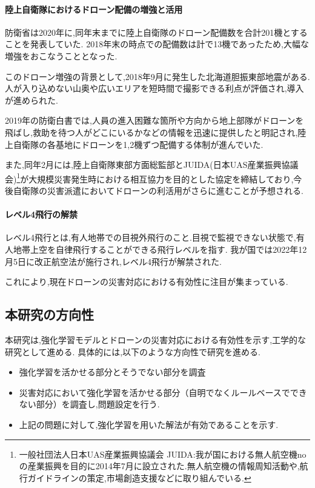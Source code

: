 \documentclass{article}[jsarticle]
\begin{document}
\paragraph{陸上自衛隊におけるドローン配備の増強と活用}
防衛省は2020年に,同年末までに陸上自衛隊のドローン配備数を合計201機とすることを発表\cite{news02}していた.
2018年末の時点での配備数は計で13機であったため,大幅な増強をおこなうこととなった.\par
このドローン増強の背景として,2018年9月に発生した北海道胆振東部地震がある.人が入り込めない山奥や広いエリアを短時間で撮影できる利点が評価され,導入が進められた.\par
2019年の防衛白書では,人員の進入困難な箇所や方向から地上部隊がドローンを飛ばし,救助を待つ人がどこにいるかなどの情報を迅速に提供したと明記され,陸上自衛隊の各基地にドローンを1,2機ずつ配備する体制が進んでいた.\par
また,同年2月には,陸上自衛隊東部方面総監部とJUIDA(日本UAS産業振興協議会)\footnote{一般社団法人日本UAS産業振興協議会 JUIDA:我が国における無人航空機no
の産業振興を目的に2014年7月に設立された.無人航空機の情報周知活動や,航行ガイドラインの策定,市場創造支援などに取り組んでいる.}が大規模災害発生時における相互協力を目的とした協定を締結しており,今後自衛隊の災害派遣においてドローンの利活用がさらに進むことが予想される.
\paragraph{レベル4飛行の解禁} \par
レベル4飛行とは,有人地帯での目視外飛行のこと.目視で監視できない状態で,有人地帯上空を自律飛行することができる飛行レベルを指す.
我が国では2022年12月5日に改正航空法が施行され,レベル4飛行が解禁された\cite{doc01}.\par 
これにより,現在ドローンの災害対応における有効性に注目が集まっている.

\subsection{本研究の方向性}
本研究は,強化学習モデルとドローンの災害対応における有効性を示す,工学的な研究として進める.
具体的には,以下のような方向性で研究を進める.
\begin{itemize}
    \item 強化学習を活かせる部分とそうでない部分を調査
    \item 災害対応において強化学習を活かせる部分（自明でなくルールベースでできない部分）を調査し,問題設定を行う.
    \item 上記の問題に対して,強化学習を用いた解法が有効であることを示す.
\end{itemize}
\end{document}
